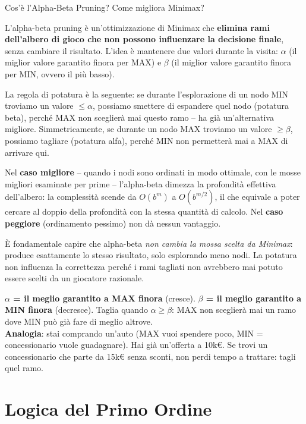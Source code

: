 \documentclass[12pt,a4paper]{article}
\begin{document}
\begin{domandabox}{Cos'è l'Alpha-Beta Pruning? Come migliora Minimax?}
\end{domandabox}

L'alpha-beta pruning è un'ottimizzazione di Minimax che \textbf{elimina rami dell'albero di gioco che non possono influenzare la decisione finale}, senza cambiare il risultato. L'idea è mantenere due valori durante la visita: $\alpha$ (il miglior valore garantito finora per MAX) e $\beta$ (il miglior valore garantito finora per MIN, ovvero il più basso).

La regola di potatura è la seguente: se durante l'esplorazione di un nodo MIN troviamo un valore $\leq \alpha$, possiamo smettere di espandere quel nodo (potatura beta), perché MAX non sceglierà mai questo ramo -- ha già un'alternativa migliore. Simmetricamente, se durante un nodo MAX troviamo un valore $\geq \beta$, possiamo tagliare (potatura alfa), perché MIN non permetterà mai a MAX di arrivare qui.

Nel \textbf{caso migliore} -- quando i nodi sono ordinati in modo ottimale, con le mosse migliori esaminate per prime -- l'alpha-beta dimezza la profondità effettiva dell'albero: la complessità scende da $O(b^m)$ a $O(b^{m/2})$, il che equivale a poter cercare al doppio della profondità con la stessa quantità di calcolo. Nel \textbf{caso peggiore} (ordinamento pessimo) non dà nessun vantaggio.

È fondamentale capire che alpha-beta \emph{non cambia la mossa scelta da Minimax}: produce esattamente lo stesso risultato, solo esplorando meno nodi. La potatura non influenza la correttezza perché i rami tagliati non avrebbero mai potuto essere scelti da un giocatore razionale.

\begin{ricordabox}
\textbf{$\alpha$ = il meglio garantito a MAX finora} (cresce). \textbf{$\beta$ = il meglio garantito a MIN finora} (decresce). Taglia quando $\alpha \geq \beta$: MAX non sceglierà mai un ramo dove MIN può già fare di meglio altrove.\\[3pt]
\textbf{Analogia}: stai comprando un'auto (MAX vuoi spendere poco, MIN = concessionario vuole guadagnare). Hai già un'offerta a 10k€. Se trovi un concessionario che parte da 15k€ senza sconti, non perdi tempo a trattare: tagli quel ramo.
\end{ricordabox}

\section{Logica del Primo Ordine}
\end{document}
